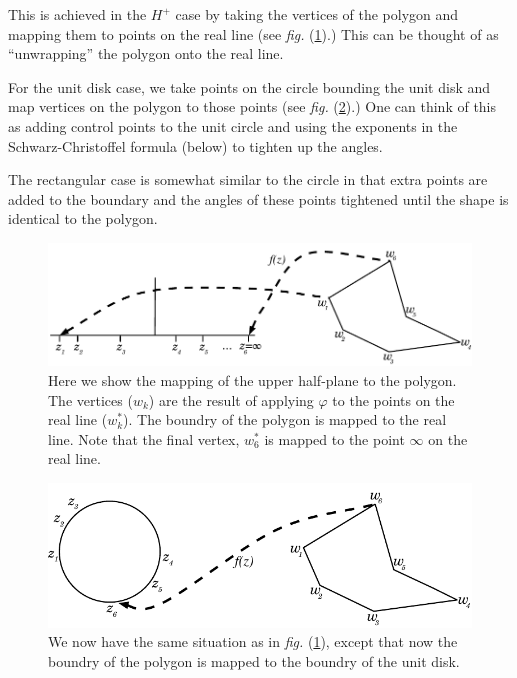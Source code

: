 \documentclass[a4paper,10pt]{amsart}
\newcommand{\sch}{Schwarz-Christoffel }
\newcommand{\fig}[1]{\emph{fig.} (\ref{#1})}
\renewcommand{\phi}{\varphi}
\begin{document}
This is achieved in the $H^+$ case by taking the vertices of the polygon and mapping them to points on the real line (see \fig{reallinedia}.) This can be thought of as ``unwrapping'' the polygon onto the real line. 

For the unit disk case, we take points on the circle bounding the unit disk and map vertices on the polygon to those points (see \fig{unitdiskdia}.) One can think of this as adding control points to the unit circle and using the exponents in the \sch formula (below) to tighten up the angles.

The rectangular case is somewhat similar to the circle in that extra points are added to the boundary and the angles of these points tightened until the shape is identical to the polygon.

\begin{figure} [tbp]
\centering
\includegraphics[scale=0.6]{figs/reallinedia.pdf}
\caption{Here we show the mapping of the upper half-plane to the polygon. The vertices ($w_k$) are the result of applying $\phi$ to the points on the real line ($w^*_k$). The boundry of the polygon is mapped to the real line. Note that the final vertex, $w^*_6$ is mapped to the point $\infty$ on the real line.}
\label{reallinedia}
\end{figure}

\begin{figure} [tbp]
\centering
\includegraphics[scale=0.6]{figs/unitdiskdia.pdf}
\caption{We now have the same situation as in \fig{reallinedia}, except that now the boundry of the polygon is mapped to the boundry of the unit disk.}
\label{unitdiskdia}
\end{figure}
\end{document}
